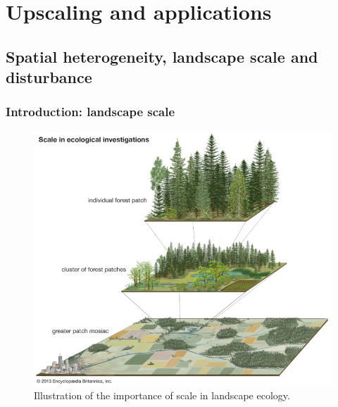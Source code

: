 \documentclass[
  12pt,
  oneside]{book}
\begin{document}
\hypertarget{part-upscaling-and-applications}{%
\part{Upscaling and applications}\label{part-upscaling-and-applications}}

\hypertarget{spatial-heterogeneity-landscape-scale-and-disturbance}{%
\chapter{Spatial heterogeneity, landscape scale and disturbance}\label{spatial-heterogeneity-landscape-scale-and-disturbance}}


\hypertarget{introduction-landscape-scale}{%
\section{Introduction: landscape scale}\label{introduction-landscape-scale}}

\begin{figure}

{\centering \includegraphics[width=0.8\linewidth]{figures/chap8/f81_landscape} 

}

\caption{Illustration of the importance of scale in landscape ecology.}\label{fig:f81}
\end{figure}
\end{document}
